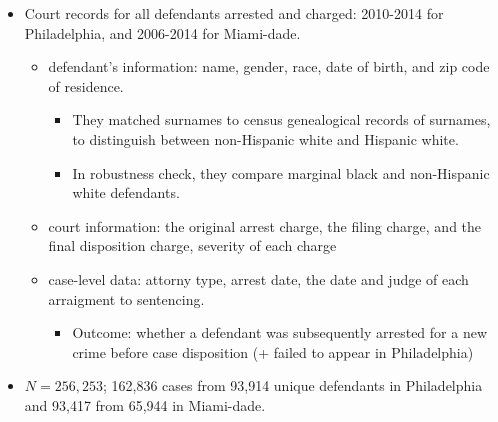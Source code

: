 \documentclass[../root]{subfiles}
\begin{document}
    \begin{itemize}
      \item Court records for all defendants arrested and charged: 2010-2014 for Philadelphia, and 2006-2014 for Miami-dade.
      \begin{itemize}
        \item defendant's information: name, gender, race, date of birth, and zip code of residence.
        \begin{itemize}
          \item They matched surnames to census genealogical records of surnames, to distinguish between non-Hispanic white and Hispanic white.
          \item In robustness check, they compare marginal black and non-Hispanic white defendants.
        \end{itemize}
        \item court information: the original arrest charge, the filing charge, and the final disposition charge, severity of each charge
        \item case-level data: attorny type, arrest date, the date and judge of each arraigment to sentencing.
        \begin{itemize}
          \item Outcome: whether a defendant was subsequently arrested for a new crime before case disposition (+ failed to appear in Philadelphia)
        \end{itemize}
      \end{itemize}
      \item $N = 256,253‬$; 162,836 cases from 93,914 unique defendants in Philadelphia and 93,417 from 65,944 in Miami-dade.
    \end{itemize}
\end{document}
